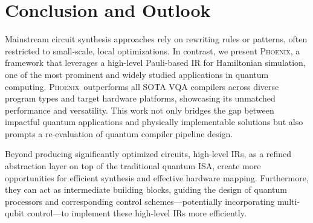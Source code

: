 \documentclass[conference,9pt]{IEEEtran}
\newcommand{\DD}[1]{{\color{cyan}[DD: #1]}}
\newcommand{\phoenix}{\textsc{Phoenix}}
\begin{document}

\section{Conclusion and Outlook}
Mainstream circuit synthesis approaches rely on rewriting rules or patterns, often restricted to small-scale, local optimizations. In contrast, we present \phoenix, a framework that leverages a high-level Pauli-based IR for Hamiltonian simulation, one of the most prominent and widely studied applications in quantum computing. \phoenix\ outperforms all SOTA VQA compilers across diverse program types and target hardware platforms, showcasing its unmatched performance and versatility. This work not only bridges the gap between impactful quantum applications and physically implementable solutions but also prompts a re-evaluation of quantum compiler pipeline design.


Beyond producing significantly optimized circuits, high-level IRs, as a refined abstraction layer on top of the traditional quantum ISA, create more opportunities for efficient synthesis and effective hardware mapping. Furthermore, they can act as intermediate building blocks, guiding the design of quantum processors and corresponding control schemes---potentially incorporating multi-qubit control---to implement these high-level IRs more efficiently.









\end{document}
